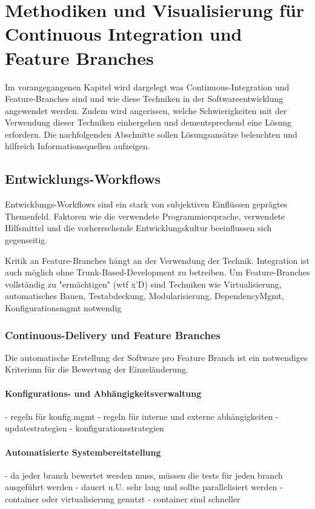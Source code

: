 \chapter{Methodiken und Visualisierung für Continuous Integration und Feature Branches}
\label{ch:visu_meth}

Im vorangegangenen Kapitel wird dargelegt was Continuous-Integration und Feature-Branches sind und wie diese Techniken in der Softwareentwicklung angewendet werden. Zudem wird angerissen, welche Schwierigkeiten mit der Verwendung dieser Techniken einhergehen und dementsprechend eine Lösung erfordern. 
Die nachfolgenden Abschnitte sollen Lösungsansätze beleuchten und hilfreich Informationsquellen aufzeigen.

\section{Entwicklungs-Workflows}

Entwicklungs-Workflows sind ein stark von subjektiven Einflüssen geprägtes Themenfeld. Faktoren wie die verwendete Programmiersprache, verwendete Hilfsmittel und die vorherrschende Entwicklungskultur beeinflussen sich gegenseitig.

Kritik an Feature-Branches hängt an der Verwendung der Technik. Integration ist auch möglich ohne Trunk-Based-Development zu betreiben. Um Feature-Branches vollständig zu "ermächtigen" (wtf x'D) sind Techniken wie Virtualisierung, automatisches Bauen, Testabdeckung, Modularisierung, DependencyMgmt, Konfigurationsmgmt notwendig

\subsection{Continuous-Delivery und Feature Branches}

Die automatische Erstellung der Software pro Feature Branch ist ein notwendiges Kriterium für die Bewertung der Einzeländerung.

\subsubsection{Konfigurations- und Abhängigkeitsverwaltung}
- regeln für konfig.mgmt
- regeln für interne und externe abhängigkeiten
- updatestrategien
- konfigurationsstrategien
\subsubsection{Automatisierte Systembereitstellung}
- da jeder branch bewertet werden muss, müssen die tests für jeden branch ausgeführt werden
- dauert u.U. sehr lang und sollte parallelisiert werden
- container oder virtualisierung genutzt 
- container sind schneller
